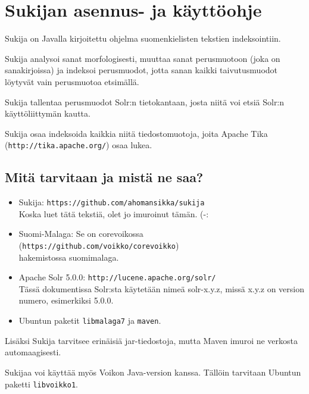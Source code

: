 \documentclass[12pt,a4paper]{scrartcl}
\begin{document}
\pagestyle{fancy}
\setlength{\parindent}{0pt}
\setlength{\parskip}{1ex plus 0.5ex minus 0.2ex}
\section*{Sukijan asennus- ja käyttöohje}

Sukija on Javalla kirjoitettu ohjelma suomenkielisten tekstien
indeksointiin.

Sukija analysoi sanat morfologisesti, muuttaa sanat perusmuotoon (joka
on sanakirjoissa) ja indeksoi perusmuodot, jotta sanan kaikki
taivutusmuodot löytyvät vain perusmuotoa etsimällä.

Sukija tallentaa perusmuodot Solr:n tietokantaan, josta niitä voi
etsiä Solr:n käyttöliittymän kautta.

Sukija osaa indeksoida kaikkia niitä tiedostomuotoja, joita Apache
Tika \\(\verb=http://tika.apache.org/=) osaa lukea.

\subsection*{Mitä tarvitaan ja mistä ne saa?}

\begin{itemize}

\item Sukija:
      \verb=https://github.com/ahomansikka/sukija= \\
      Koska luet tätä tekstiä, olet jo imuroinut tämän. (-:

\item Suomi-Malaga: Se on corevoikossa
      (\verb=https://github.com/voikko/corevoikko=) \\
      hakemistossa suomimalaga.

\item Apache Solr 5.0.0:
      \verb=http://lucene.apache.org/solr/= \\
      Tässä dokumentissa Solr:sta käytetään nimeä solr-x.y.z,
      missä x.y.z on version numero, esimerkiksi 5.0.0.

\item Ubuntun paketit \verb=libmalaga7= ja \verb=maven=.
\end{itemize}

Lisäksi Sukija tarvitsee erinäisiä jar-tiedostoja, mutta Maven imuroi
ne verkosta automaagisesti.

Sukijaa voi käyttää myös Voikon Java-version kanssa. Tällöin tarvitaan
Ubuntun paketti \verb=libvoikko1=.
\end{document}
